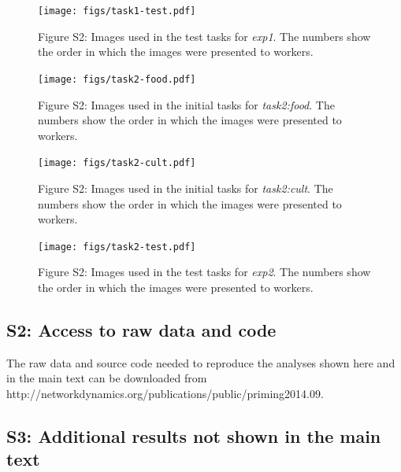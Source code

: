 \documentclass[12pt]{article}
\begin{document}
\begin{figure}
	\texttt{[image: figs/task1-test.pdf]}
	\label{fig:task1:test}
	\caption{
		Figure S2: Images used in the test tasks for 
		\textit{exp1}.  The numbers show the order in which the 
		images were presented to workers.
	}
\end{figure}

\begin{figure}
	\texttt{[image: figs/task2-food.pdf]}
	\label{fig:task2:food}
	\caption{
		Figure S2: Images used in the initial tasks for 
		\textit{task2:food}.  The numbers show the order in which the 
		images were presented to workers.
	}
\end{figure}

\begin{figure}
	\texttt{[image: figs/task2-cult.pdf]}
	\label{fig:task2:cult}
	\caption{
		Figure S2: Images used in the initial tasks for 
		\textit{task2:cult}.  The numbers show the order in which the 
		images were presented to workers.
	}
\end{figure}

\begin{figure}
	\texttt{[image: figs/task2-test.pdf]}
	\label{fig:task2:test}
	\caption{
		Figure S2: Images used in the test tasks for 
		\textit{exp2}.  The numbers show the order in which the 
		images were presented to workers.
	}
\end{figure}

\subsection*{S2: Access to raw data and code}
The raw data and source code needed to reproduce the analyses 
shown here and in the main text can be downloaded from 
http://networkdynamics.org/publications/public/priming2014.09.

\subsection*{S3: Additional results not shown in the main text}
\end{document}
